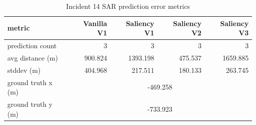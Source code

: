 \begin{table}[ht]
\centering
\caption{Incident 14 SAR prediction error metrics}
\label{tab:sar-incident-14}
\begin{tabular}{lrrrr}
\hline
metric & Vanilla V1 & Saliency V1 & Saliency V2 & Saliency V3 \\
\hline
prediction count & 3 & 3 & 3 & 3 \\
avg distance (m) & 900.824 & 1393.198 & 475.537 & 1659.885 \\
stddev (m) & 404.968 & 217.511 & 180.133 & 263.745 \\
ground truth x (m) & \multicolumn{4}{c}{-469.258} \\
ground truth y (m) & \multicolumn{4}{c}{-733.923} \\
\hline
\end{tabular}
\end{table}
